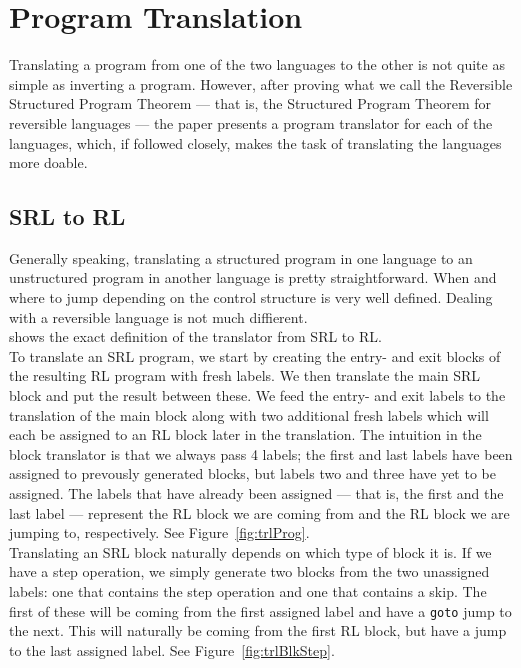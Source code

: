 \section{Program Translation}
Translating a program from one of the two languages to the other is not quite as simple as inverting a program. %
However, after proving what we call the Reversible Structured Program Theorem --- that is, the Structured Program Theorem for reversible languages --- the paper presents a program translator for each of the languages, which, if followed closely, makes the task of translating the languages more doable.

\subsection{SRL to RL}

Generally speaking, translating a structured program in one language to an unstructured program in another language is pretty straightforward. When and where to jump depending on the control structure is very well defined. Dealing with a reversible language is not much diffierent.\\

\noindent \cite[Fig.~21]{REV} shows the exact definition of the translator from SRL to RL.\\

\noindent To translate an SRL program, we start by creating the entry- and exit blocks of the resulting RL program with fresh labels. We then translate the main SRL block and put the result between these. We feed the entry- and exit labels to the translation of the main block along with two additional fresh labels which will each be assigned to an RL block later in the translation. The intuition in the block translator is that we always pass 4 labels; the first and last labels have been assigned to prevously generated blocks, but labels two and three have yet to be assigned. The labels that have already been assigned --- that is, the first and the last label --- represent the RL block we are coming from and the RL block we are jumping to, respectively. See Figure~\ref{fig:trlProg}.\\

\noindent Translating an SRL block naturally depends on which type of block it is. If we have a step operation, we simply generate two blocks from the two unassigned labels: one that contains the step operation and one that contains a skip. The first of these will be coming from the first assigned label and have a \texttt{goto} jump to the next. This will naturally be coming from the first RL block, but have a jump to the last assigned label. See Figure~\ref{fig:trlBlkStep}.\\

